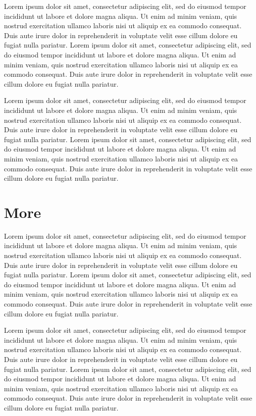 \documentclass[11pt]{report}
\begin{document}
Lorem ipsum dolor sit amet, consectetur adipiscing elit, sed do eiusmod tempor incididunt ut labore et dolore magna aliqua. Ut enim ad minim veniam, quis nostrud exercitation ullamco laboris nisi ut aliquip ex ea commodo consequat. Duis aute irure dolor in reprehenderit in voluptate velit esse cillum dolore eu fugiat nulla pariatur. Lorem ipsum dolor sit amet, consectetur adipiscing elit, sed do eiusmod tempor incididunt ut labore et dolore magna aliqua. Ut enim ad minim veniam, quis nostrud exercitation ullamco laboris nisi ut aliquip ex ea commodo consequat. Duis aute irure dolor in reprehenderit in voluptate velit esse cillum dolore eu fugiat nulla pariatur.

Lorem ipsum dolor sit amet, consectetur adipiscing elit, sed do eiusmod tempor incididunt ut labore et dolore magna aliqua. Ut enim ad minim veniam, quis nostrud exercitation ullamco laboris nisi ut aliquip ex ea commodo consequat. Duis aute irure dolor in reprehenderit in voluptate velit esse cillum dolore eu fugiat nulla pariatur. Lorem ipsum dolor sit amet, consectetur adipiscing elit, sed do eiusmod tempor incididunt ut labore et dolore magna aliqua. Ut enim ad minim veniam, quis nostrud exercitation ullamco laboris nisi ut aliquip ex ea commodo consequat. Duis aute irure dolor in reprehenderit in voluptate velit esse cillum dolore eu fugiat nulla pariatur.

\section{More}
Lorem ipsum dolor sit amet, consectetur adipiscing elit, sed do eiusmod tempor incididunt ut labore et dolore magna aliqua. Ut enim ad minim veniam, quis nostrud exercitation ullamco laboris nisi ut aliquip ex ea commodo consequat. Duis aute irure dolor in reprehenderit in voluptate velit esse cillum dolore eu fugiat nulla pariatur. Lorem ipsum dolor sit amet, consectetur adipiscing elit, sed do eiusmod tempor incididunt ut labore et dolore magna aliqua. Ut enim ad minim veniam, quis nostrud exercitation ullamco laboris nisi ut aliquip ex ea commodo consequat. Duis aute irure dolor in reprehenderit in voluptate velit esse cillum dolore eu fugiat nulla pariatur.

Lorem ipsum dolor sit amet, consectetur adipiscing elit, sed do eiusmod tempor incididunt ut labore et dolore magna aliqua. Ut enim ad minim veniam, quis nostrud exercitation ullamco laboris nisi ut aliquip ex ea commodo consequat. Duis aute irure dolor in reprehenderit in voluptate velit esse cillum dolore eu fugiat nulla pariatur. Lorem ipsum dolor sit amet, consectetur adipiscing elit, sed do eiusmod tempor incididunt ut labore et dolore magna aliqua. Ut enim ad minim veniam, quis nostrud exercitation ullamco laboris nisi ut aliquip ex ea commodo consequat. Duis aute irure dolor in reprehenderit in voluptate velit esse cillum dolore eu fugiat nulla pariatur.
\end{document}
